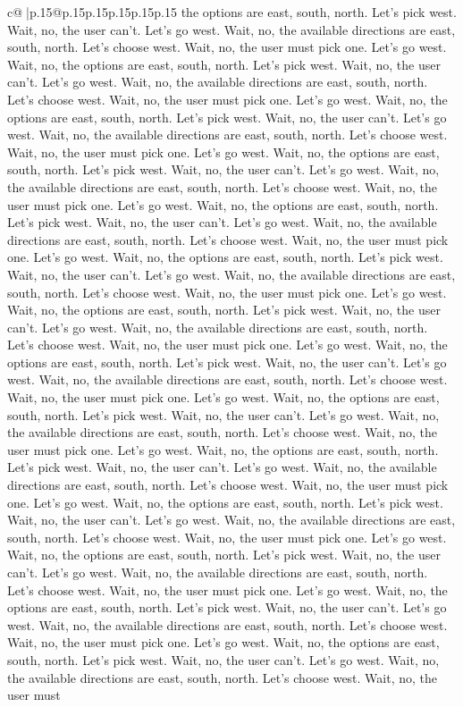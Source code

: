 \documentclass{article}
\begin{document}
{\begin{supertabular}{c@{$\;$}|p{.15\linewidth}@{}p{.15\linewidth}p{.15\linewidth}p{.15\linewidth}p{.15\linewidth}p{.15\linewidth}}
{{{the options are east, south, north. Let's pick west. Wait, no, the user can't. Let's go west. Wait, no, the available directions are east, south, north. Let's choose west. Wait, no, the user must pick one. Let's go west. Wait, no, the options are east, south, north. Let's pick west. Wait, no, the user can't. Let's go west. Wait, no, the available directions are east, south, north. Let's choose west. Wait, no, the user must pick one. Let's go west. Wait, no, the options are east, south, north. Let's pick west. Wait, no, the user can't. Let's go west. Wait, no, the available directions are east, south, north. Let's choose west. Wait, no, the user must pick one. Let's go west. Wait, no, the options are east, south, north. Let's pick west. Wait, no, the user can't. Let's go west. Wait, no, the available directions are east, south, north. Let's choose west. Wait, no, the user must pick one. Let's go west. Wait, no, the options are east, south, north. Let's pick west. Wait, no, the user can't. Let's go west. Wait, no, the available directions are east, south, north. Let's choose west. Wait, no, the user must pick one. Let's go west. Wait, no, the options are east, south, north. Let's pick west. Wait, no, the user can't. Let's go west. Wait, no, the available directions are east, south, north. Let's choose west. Wait, no, the user must pick one. Let's go west. Wait, no, the options are east, south, north. Let's pick west. Wait, no, the user can't. Let's go west. Wait, no, the available directions are east, south, north. Let's choose west. Wait, no, the user must pick one. Let's go west. Wait, no, the options are east, south, north. Let's pick west. Wait, no, the user can't. Let's go west. Wait, no, the available directions are east, south, north. Let's choose west. Wait, no, the user must pick one. Let's go west. Wait, no, the options are east, south, north. Let's pick west. Wait, no, the user can't. Let's go west. Wait, no, the available directions are east, south, north. Let's choose west. Wait, no, the user must pick one. Let's go west. Wait, no, the options are east, south, north. Let's pick west. Wait, no, the user can't. Let's go west. Wait, no, the available directions are east, south, north. Let's choose west. Wait, no, the user must pick one. Let's go west. Wait, no, the options are east, south, north. Let's pick west. Wait, no, the user can't. Let's go west. Wait, no, the available directions are east, south, north. Let's choose west. Wait, no, the user must pick one. Let's go west. Wait, no, the options are east, south, north. Let's pick west. Wait, no, the user can't. Let's go west. Wait, no, the available directions are east, south, north. Let's choose west. Wait, no, the user must pick one. Let's go west. Wait, no, the options are east, south, north. Let's pick west. Wait, no, the user can't. Let's go west. Wait, no, the available directions are east, south, north. Let's choose west. Wait, no, the user must pick one. Let's go west. Wait, no, the options are east, south, north. Let's pick west. Wait, no, the user can't. Let's go west. Wait, no, the available directions are east, south, north. Let's choose west. Wait, no, the user must }}}
\end{supertabular}}
\end{document}
